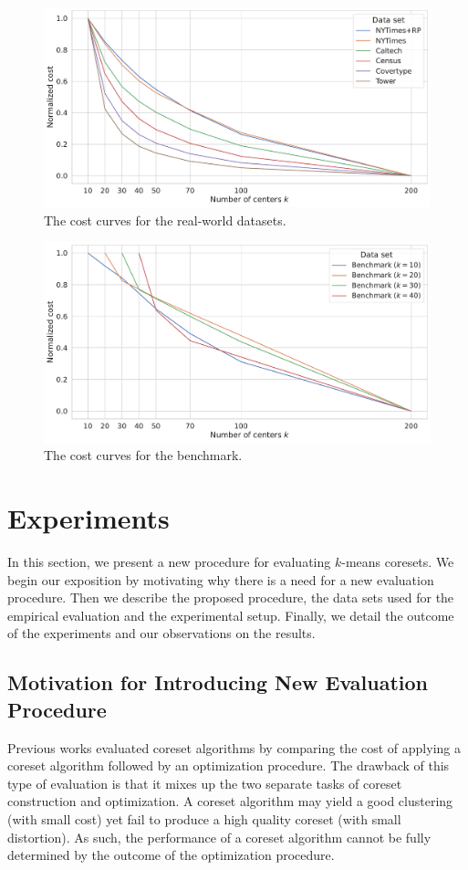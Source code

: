 
\begin{figure}
  \caption{The cost curves for the real-world datasets.}
  \label{fig:cost-curves-real-world-datasets}
  \includegraphics[width=1\linewidth]{figures/cost-curves-real-world-datasets.pdf}
\end{figure}


\begin{figure}
  \caption{The cost curves for the benchmark.}
  \label{fig:cost-curves-benchmark}
  \includegraphics[width=1\linewidth]{figures/cost-curves-benchmark.pdf}
\end{figure}


\section{Experiments} \label{sec:experiments}
In this section, we present a new procedure for evaluating $k$-means coresets. 
We begin our exposition by motivating why there is a need for a new evaluation procedure. Then we describe the proposed procedure, the data sets used for the empirical evaluation and the experimental setup. Finally, we detail the outcome of the experiments and our observations on the results.


\subsection{Motivation for Introducing New Evaluation Procedure}
Previous works evaluated coreset algorithms by comparing the cost of applying a coreset algorithm followed by an optimization procedure. The drawback of this type of evaluation is that it mixes up the two separate tasks of coreset construction and optimization. A coreset algorithm may yield a good clustering (with small cost) yet fail to produce a high quality coreset (with small distortion).
As such, the performance of a coreset algorithm cannot be fully determined by the outcome of the optimization procedure. 

